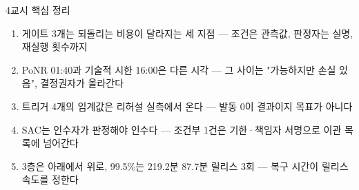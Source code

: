 \begin{frame}{4교시 핵심 정리}
\begin{enumerate}
\item 게이트 3개는 되돌리는 비용이 달라지는 세 지점 — 조건은 관측값, 판정자는 실명, 재실행 횟수까지
\item PoNR 01:40과 기술적 시한 16:00은 다른 시각 — 그 사이는 "가능하지만 손실 있음", 결정권자가 올라간다
\item 트리거 4개의 임계값은 리허설 실측에서 온다 — 발동 0이 결과이지 목표가 아니다
\item SAC는 인수자가 판정해야 인수다 — 조건부 1건은 기한·책임자 서명으로 이관 목록에 넘어간다
\item 3층은 아래에서 위로, 99.5\%는 219.2분 \ra{} 87.7분 \ra{} 릴리스 3회 — 복구 시간이 릴리스 속도를 정한다
\end{enumerate}
\end{frame}
